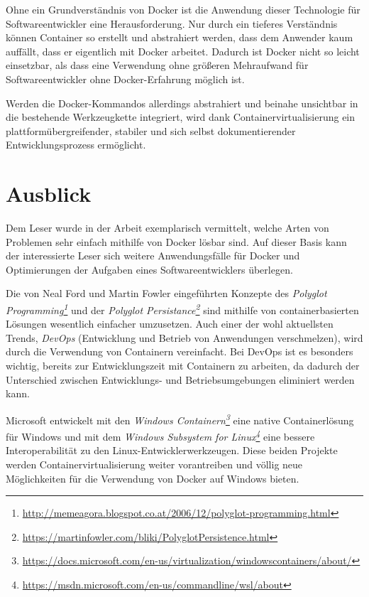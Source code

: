 Ohne ein Grundverständnis von Docker ist die Anwendung dieser Technologie für Softwareentwickler eine Herausforderung.
Nur durch ein tieferes Verständnis können Container so erstellt und abstrahiert werden, dass dem Anwender kaum auffällt, dass er eigentlich mit Docker arbeitet.
Dadurch ist Docker nicht so leicht einsetzbar, als dass eine Verwendung ohne größeren Mehraufwand für Softwareentwickler ohne Docker-Erfahrung möglich ist.

Werden die Docker-Kommandos allerdings abstrahiert und beinahe unsichtbar in die bestehende Werkzeugkette integriert, wird dank Containervirtualisierung ein plattformübergreifender, stabiler und sich selbst dokumentierender Entwicklungsprozess ermöglicht.


\section{Ausblick}
Dem Leser wurde in der Arbeit exemplarisch vermittelt, welche Arten von Problemen sehr einfach mithilfe von Docker lösbar sind.
Auf dieser Basis kann der interessierte Leser sich weitere Anwendungsfälle für Docker und Optimierungen der Aufgaben eines Softwareentwicklers überlegen.

Die von Neal Ford und Martin Fowler eingeführten Konzepte des \emph{Polyglot Programming\footnote{\url{http://memeagora.blogspot.co.at/2006/12/polyglot-programming.html}}} und der \emph{Polyglot Persistance\footnote{\url{https://martinfowler.com/bliki/PolyglotPersistence.html}}} sind mithilfe von containerbasierten Lösungen wesentlich einfacher umzusetzen.
Auch einer der wohl aktuellsten Trends, \emph{DevOps} (Entwicklung und Betrieb von Anwendungen verschmelzen), wird durch die Verwendung von Containern vereinfacht.
Bei DevOps ist es besonders wichtig, bereits zur Entwicklungszeit mit Containern zu arbeiten, da dadurch der Unterschied zwischen Entwicklungs- und Betriebsumgebungen eliminiert werden kann.

Microsoft entwickelt mit den \emph{Windows Containern\footnote{\url{https://docs.microsoft.com/en-us/virtualization/windowscontainers/about/}}} eine native Containerlösung für Windows und mit dem \emph{Windows Subsystem for Linux\footnote{\url{https://msdn.microsoft.com/en-us/commandline/wsl/about}}} eine bessere Interoperabilität zu den Linux-Entwicklerwerkzeugen.
Diese beiden Projekte werden Containervirtualisierung weiter vorantreiben und völlig neue Möglichkeiten für die Verwendung von Docker auf Windows bieten.

